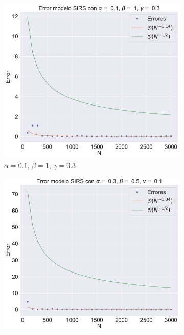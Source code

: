 \begin{figure}[h]
    \centering
    \begin{subfigure}[b]{0.32\textwidth}
        \centering
        \includegraphics[width=\textwidth]{img/content/chapter3/SIRS1Errors.pdf}
        \caption{$\alpha=0.1$, $\beta=1$, $\gamma=0.3$}
    \end{subfigure}
    \hfill
    \begin{subfigure}[b]{0.32\textwidth}
        \centering
        \includegraphics[width=\textwidth]{img/content/chapter3/SIRS2Errors.pdf}

\end{subfigure}
\end{figure}
